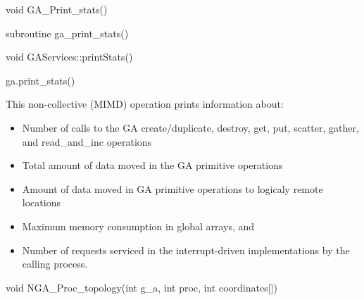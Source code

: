 \documentclass[12pt]{article}
\begin{document}

\begin{capi}
\begin{ccode}
void GA_Print_stats()
\end{ccode}
\end{capi}

\begin{fapi}
\begin{fcode}
subroutine ga_print_stats()
\end{fcode}
\end{fapi}

\begin{cxxapi}
\begin{cxxcode}
void GAServices::printStats()
\end{cxxcode}
\end{cxxapi}

\begin{pyapi}
\begin{pycode}
ga.print_stats()
\end{pycode}
\end{pyapi}

\local

\begin{desc}

This non-collective (MIMD) operation prints information about:
\begin{itemize}
    \item Number of calls to the GA create/duplicate, destroy, get, put,
    scatter, gather, and read_and_inc operations
    \item Total amount of data moved in the GA primitive operations
    \item Amount of data moved in GA primitive operations to logicaly remote
    locations
    \item Maximum memory consumption in global arrays, and
    \item Number of requests serviced in the interrupt-driven implementations
    by the calling process.
\end{itemize}

\end{desc}


\begin{capi}
\begin{ccode}
void NGA_Proc_topology(int g_a, int proc, int coordinates[])
\end{ccode}
\begin{funcargs}
\end{funcargs}
\end{capi}
\end{document}
